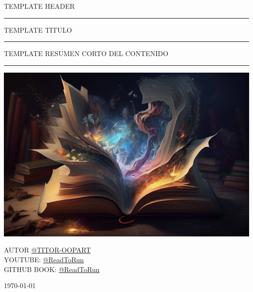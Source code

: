\begin{titlepage}
	\noindent
	\centering
	\Large {TEMPLATE HEADER}
	\begin{center}
		\centering
		\rule{150 mm}{0.1 mm}
		\Large {TEMPLATE TITULO\\}
		
		\rule{150 mm}{0.1 mm}
		\large {{TEMPLATE RESUMEN CORTO DEL CONTENIDO}}	
		\rule{150 mm}{0.4 mm}
		\vspace{1 cm}
		\vspace{0.3 cm}
		\includegraphics[width=1\textwidth]{image/cover.jpg}
	\end{center}
	\vspace{0.3 cm}
	\begin{center}
		{\large AUTOR
			{\href{https://github.com/titor-oopart/}{@TITOR-OOPART}}}	\\
		{\large YOUTUBE:	{\href{https://www.youtube.com/@ReadToRun}{@ReadToRun}}}	\\
		{\large GITHUB BOOK:  	{\href{https://github.com/titor-oopart/latex_template_programming}{@ReadToRun}}}\\
	\end{center}
	\vspace{0.5 cm}
	\vfill
	\begin{center}
		\large\today
	\end{center}
\end{titlepage}
